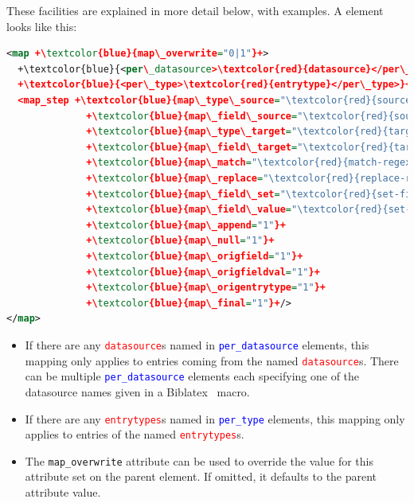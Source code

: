 \documentclass{ltxdockit}
\newcommand*{\biblatex}{Biblatex\xspace}
\begin{document}
\noindent These facilities are explained in more detail below, with
examples. A  element looks like this:

\begin{lstlisting}[language=xml,escapechar=+,mathescape=true]
<map +\textcolor{blue}{map\_overwrite="0|1"}+>
  +\textcolor{blue}{<per\_datasource>\textcolor{red}{datasource}</per\_datasource>}+
  +\textcolor{blue}{<per\_type>\textcolor{red}{entrytype}</per\_type>}+
  <map_step +\textcolor{blue}{map\_type\_source="\textcolor{red}{source-entrytype}"}+
              +\textcolor{blue}{map\_field\_source="\textcolor{red}{source-field}"}+
              +\textcolor{blue}{map\_type\_target="\textcolor{red}{target-entrytype}"}+
              +\textcolor{blue}{map\_field\_target="\textcolor{red}{target-field}"}+
              +\textcolor{blue}{map\_match="\textcolor{red}{match-regexp}"}+
              +\textcolor{blue}{map\_replace="\textcolor{red}{replace-regexp}"}+
              +\textcolor{blue}{map\_field\_set="\textcolor{red}{set-field}"}+
              +\textcolor{blue}{map\_field\_value="\textcolor{red}{set-value}"}+
              +\textcolor{blue}{map\_append="1"}+
              +\textcolor{blue}{map\_null="1"}+
              +\textcolor{blue}{map\_origfield="1"}+
              +\textcolor{blue}{map\_origfieldval="1"}+
              +\textcolor{blue}{map\_origentrytype="1"}+
              +\textcolor{blue}{map\_final="1"}+/>
</map>
\end{lstlisting}

\begin{itemize}
\item If there are any \textcolor{red}{\texttt{datasource}}s named in
  \textcolor{blue}{\texttt{per\_datasource}} elements, this mapping only applies to entries
  coming from the named \textcolor{red}{\texttt{datasource}}s. There can be
  multiple \textcolor{blue}{\texttt{per\_datasource}} elements each specifying one of the
  datasource names given in a \biblatex\ \verb++ macro.
\item If there are any \textcolor{red}{\texttt{entrytypes}}s named in
  \textcolor{blue}{\texttt{per\_type}} elements, this mapping only applies to entries
  of the named \textcolor{red}{\texttt{entrytypes}}s.
\item The \texttt{map\_overwrite} attribute can be used to override the
  value for this attribute set on the parent  element. If
  omitted, it defaults to the parent  attribute value.
\end{itemize}
\end{document}
